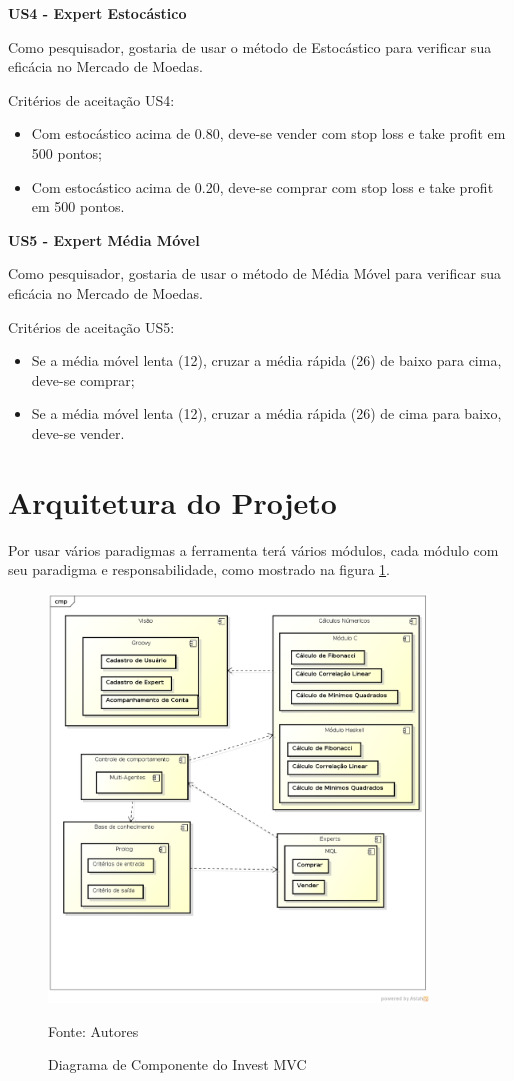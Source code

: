 \textbf{US4 - Expert Estocástico}

Como pesquisador, gostaria de usar o método de Estocástico para verificar sua eficácia no Mercado de Moedas.

Critérios de aceitação US4:
\begin{itemize}
\item Com estocástico acima de 0.80, deve-se vender com stop loss e take profit em 500 pontos;
\item Com estocástico acima de 0.20, deve-se comprar com stop loss e take profit em 500 pontos.
\end{itemize}

\textbf{US5 - Expert Média Móvel}

Como pesquisador, gostaria de usar o método de Média Móvel para verificar sua eficácia no Mercado de Moedas.

Critérios de aceitação US5:
\begin{itemize}
\item Se a média móvel lenta (12), cruzar a média rápida (26) de baixo para cima, deve-se comprar;
\item Se a média móvel lenta (12), cruzar a média rápida (26) de cima para baixo, deve-se vender.
\end{itemize}

\section{Arquitetura do Projeto}

Por usar vários paradigmas a ferramenta terá vários módulos, cada módulo com seu paradigma e responsabilidade, como mostrado na figura \ref{componente}.

\begin{figure}[htp]
\centering
\includegraphics[width=0.9\textwidth]{figuras/componente}
\caption{Diagrama de Componente do Invest MVC}{Fonte: Autores} 
\label{componente}
\end{figure}

